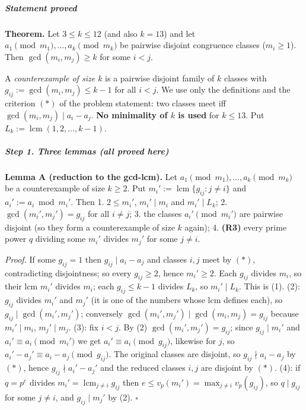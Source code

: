 \documentclass[11pt,a4paper]{article}
\begin{document}
\subparagraph{Statement proved}\label{statement-proved}

\textbf{Theorem.} Let \(3\le k\le 12\) (and also \(k=13\)) and let
\(a_1 \pmod{m_1},\dots,a_k\pmod{m_k}\) be pairwise disjoint congruence
classes (\(m_i\ge1\)). Then \(\gcd(m_i,m_j)\ge k\) for some \(i<j\).

A \emph{counterexample of size \(k\)} is a pairwise disjoint family of
\(k\) classes with \(g_{ij}:=\gcd(m_i,m_j)\le k-1\) for all \(i<j\). We
use only the definitions and the criterion \((*)\) of the problem
statement: two classes meet iff \(\gcd(m_i,m_j)\mid a_i-a_j\).
\textbf{No minimality of \(k\) is used} for \(k\le13\). Put
\(L_k:=\operatorname{lcm}(1,2,\dots,k-1)\).

\subparagraph{Step 1. Three lemmas (all proved
here)}\label{step-1.-three-lemmas-all-proved-here}

\textbf{Lemma A (reduction to the gcd-lcm).} Let
\(a_1\pmod{m_1},\dots,a_k\pmod{m_k}\) be a counterexample of size
\(k\ge2\). Put \(m_i':=\operatorname{lcm}\{g_{ij}: j\ne i\}\) and
\(a_i':=a_i \bmod m_i'\). Then 1. \(2\le m_i'\), \(m_i'\mid m_i\) and
\(m_i'\mid L_k\); 2. \(\gcd(m_i',m_j')=g_{ij}\) for all \(i\ne j\); 3.
the classes \(a_i'\pmod{m_i'}\) are pairwise disjoint (so they form a
counterexample of size \(k\) again); 4. \textbf{(R3)} every prime power
\(q\) dividing some \(m_i'\) divides \(m_j'\) for some \(j\ne i\).

\emph{Proof.} If some \(g_{ij}=1\) then \(g_{ij}\mid a_i-a_j\) and
classes \(i,j\) meet by \((*)\), contradicting disjointness; so every
\(g_{ij}\ge2\), hence \(m_i'\ge2\). Each \(g_{ij}\) divides \(m_i\), so
their lcm \(m_i'\) divides \(m_i\); each \(g_{ij}\le k-1\) divides
\(L_k\), so \(m_i'\mid L_k\). This is (1). (2): \(g_{ij}\) divides
\(m_i'\) and \(m_j'\) (it is one of the numbers whose lcm defines each),
so \(g_{ij}\mid\gcd(m_i',m_j')\); conversely
\(\gcd(m_i',m_j')\mid\gcd(m_i,m_j)=g_{ij}\) because \(m_i'\mid m_i\),
\(m_j'\mid m_j\). (3): fix \(i<j\). By (2) \(\gcd(m_i',m_j')=g_{ij}\);
since \(g_{ij}\mid m_i'\) and \(a_i'\equiv a_i\pmod{m_i'}\) we get
\(a_i'\equiv a_i\pmod{g_{ij}}\), likewise for \(j\), so
\(a_i'-a_j'\equiv a_i-a_j\pmod{g_{ij}}\). The original classes are
disjoint, so \(g_{ij}\nmid a_i-a_j\) by \((*)\), hence
\(g_{ij}\nmid a_i'-a_j'\) and the reduced classes \(i,j\) are disjoint
by \((*)\). (4): if \(q=p^e\) divides
\(m_i'=\operatorname{lcm}_{j\ne i} g_{ij}\) then
\(e\le v_p(m_i')=\max_{j\ne i}v_p(g_{ij})\), so \(q\mid g_{ij}\) for
some \(j\ne i\), and \(g_{ij}\mid m_j'\) by (2). \(\square\)
\end{document}
